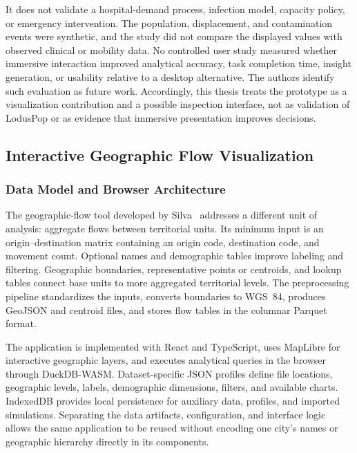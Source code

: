 It does not validate a hospital-demand process, infection model, capacity policy, or emergency intervention. The population, displacement, and contamination events were synthetic, and the study did not compare the displayed values with observed clinical or mobility data. No controlled user study measured whether immersive interaction improved analytical accuracy, task completion time, insight generation, or usability relative to a desktop alternative. The authors identify such evaluation as future work. Accordingly, this thesis treats the prototype as a visualization contribution and a possible inspection interface, not as validation of LodusPop or as evidence that immersive presentation improves decisions.

\subsection{Interactive Geographic Flow Visualization}
\label{visualization:od}

\subsubsection{Data Model and Browser Architecture}

The geographic-flow tool developed by Silva~\citep{silva2026geospatial} addresses a different unit of analysis: aggregate flows between territorial units. Its minimum input is an origin--destination matrix containing an origin code, destination code, and movement count. Optional names and demographic tables improve labeling and filtering. Geographic boundaries, representative points or centroids, and lookup tables connect base units to more aggregated territorial levels. The preprocessing pipeline standardizes the inputs, converts boundaries to WGS~84, produces GeoJSON and centroid files, and stores flow tables in the columnar Parquet format.

The application is implemented with React and TypeScript, uses MapLibre for interactive geographic layers, and executes analytical queries in the browser through DuckDB-WASM. Dataset-specific JSON profiles define file locations, geographic levels, labels, demographic dimensions, filters, and available charts. IndexedDB provides local persistence for auxiliary data, profiles, and imported simulations. Separating the data artifacts, configuration, and interface logic allows the same application to be reused without encoding one city's names or geographic hierarchy directly in its components.

